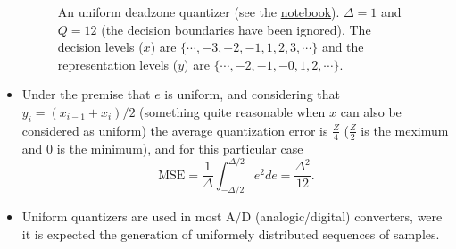 \begin{itemize}
  \begin{figure}
    \caption{An uniform deadzone quantizer (see the
      \href{https://nbviewer.jupyter.org/github/vicente-gonzalez-ruiz/quantization/blob/master/graphics/deadzone.ipynb}{notebook}). $\Delta=1$
      and $Q=12$ (the decision boundaries have been ignored). The
      decision levels ($x$) are $\{\cdots,-3,-2,-1,1,2,3,\cdots\}$
      and the representation levels ($y$) are
      $\{\cdots,-2,-1,-0,1,2,\cdots\}$.}
    \label{fig:deadzone}
  \end{figure}

\item
  Under the premise that $e$ is uniform, and considering that
  $y_i=(x_{i-1}+x_i)/2$ (something quite reasonable when $x$ can also be
  considered as uniform) the average quantization error is
  $\frac{Z}{4}$ ($\frac{Z}{2}$ is the meximum and $0$ is the minimum),
  and for this particular case
  \begin{equation}
    \text{MSE} =
    \frac{1}{\Delta}\int_{-\Delta/2}^{\Delta/2}e^2de=\frac{\Delta^2}{12}.
    \label{eq:MSE_uniform_scalar_quantizer}
  \end{equation}
  
\item
  Uniform quantizers are used in most A/D (analogic/digital)
  converters, were it is expected the generation of uniformely
  distributed sequences of samples.

\end{itemize}

